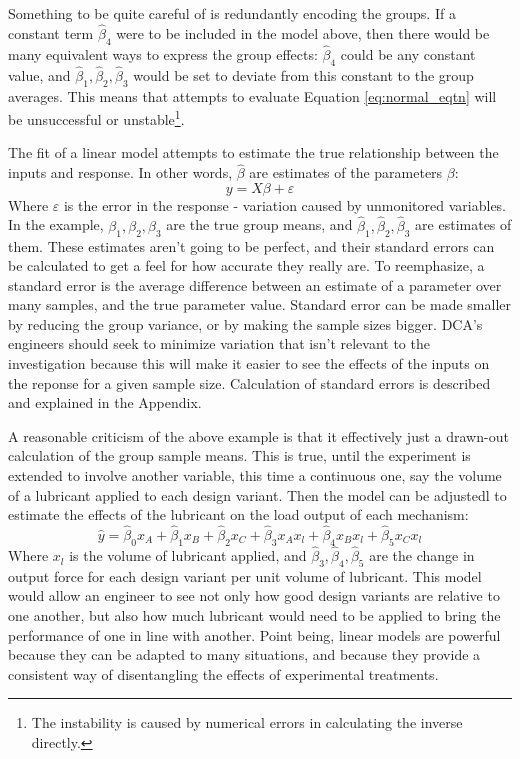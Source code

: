 \documentclass[11pt,a4paper,article]{memoir} %
\begin{document}
 Something to be quite careful of is redundantly encoding the groups. If a constant term $\hat{\beta}_4$ were to be included in the model above, then there would be many equivalent ways to express the group effects: $\hat{\beta}_4$ could be any constant value, and $\hat{\beta}_1, \hat{\beta}_2, \hat{\beta}_3$ would be set to deviate from this constant to the group averages. This means that attempts to evaluate Equation \ref{eq:normal_eqtn} will be unsuccessful or unstable\footnote{The instability is caused by numerical errors in calculating the inverse directly.}.

The fit of a linear model attempts to estimate the true relationship between the inputs and response. In other words, $\hat{\beta}$ are estimates of the parameters $\beta$:
\begin{equation}
	y = X\beta + \varepsilon
\end{equation}
Where $\varepsilon$ is the error in the response - variation caused by unmonitored variables. In the example, $\beta_1, \beta_2, \beta_3$ are the true group means, and $\hat{\beta}_1, \hat{\beta}_2, \hat{\beta}_3$ are estimates of them. These estimates aren't going to be perfect, and their standard errors can be calculated to get a feel for how accurate they really are. To reemphasize, a standard error is the average difference between an estimate of a parameter over many samples, and the true parameter value. Standard error can be made smaller by reducing the group variance, or by making the sample sizes bigger.  DCA's engineers should seek to minimize variation that isn't relevant to the investigation because this will make it easier to see the effects of the inputs on the reponse for a given sample size. Calculation of standard errors is described and explained in the Appendix.

A reasonable criticism of the above example is that it effectively just a drawn-out calculation of the group sample means. This is true, until the experiment is extended to involve another variable, this time a continuous one, say the volume of a lubricant applied to each design variant. Then the model can be adjustedl to estimate the effects of the lubricant on the load output of each mechanism:
\begin{equation}
	\hat{y} = \hat{\beta}_0 x_A + \hat{\beta}_{1}x_B + \hat{\beta}_{2}x_C + \hat{\beta}_3 x_A x_l + \hat{\beta}_4 x_B x_l + \hat{\beta}_5 x_C x_l
\end{equation}
Where $x_l$ is the volume of lubricant applied, and $\hat{\beta}_3, \hat{\beta}_4, \hat{\beta}_5$ are the change in output force for each design variant per unit volume of lubricant. This model would allow an engineer to see not only how good design variants are relative to one another, but also how much lubricant would need to be applied to bring the performance of one in line with another. Point being, linear models are powerful because they can be adapted to many situations, and because they provide a consistent way of disentangling the effects of experimental treatments.
\end{document}
